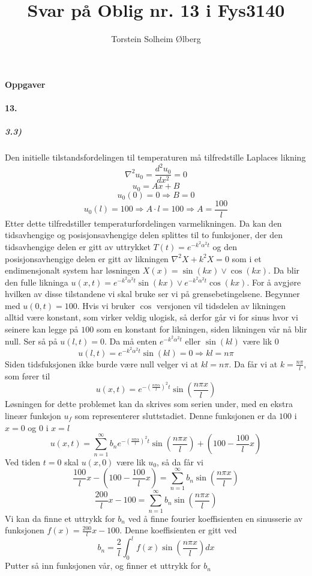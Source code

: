 \documentclass[11pt, A4paper,norsk]{article}
\author{Torstein Solheim Ølberg}
\title{Svar på Oblig nr. 13 i Fys3140}
\begin{document}
\maketitle
	\begin{center}
\Large \textbf{Oppgaver}
	\end{center}









		\paragraph{13.}
			\subparagraph{3.3)}
				\begin{flushleft}
Den initielle tilstandsfordelingen til temperaturen må tilfredstille Laplaces likning
$$\nabla^2 u_0 = \frac{d^2 u_0}{dx^2} = 0$$
$$u_0 = Ax + B$$
$$u_0(0) = 0 \Rightarrow B = 0$$
$$u_0(l) = 100 \Rightarrow A \cdot l = 100 \Rightarrow A = \frac{100}{l}$$
Etter dette tilfredstiller temperaturfordelingen varmelikningen. Da kan den tidsavhengige og posisjonsavhengige delen splittes til to funksjoner, der den tidsavhengige delen er gitt av uttrykket $T(t) = e^{- k^2 \alpha^2 t}$ og den posisjonsavhengige delen er gitt av likningen $\nabla^2 X + k^2 X = 0$ som i et endimensjonalt system har løsningen $X(x) = \sin(kx) \vee \cos(kx)$. Da blir den fulle likninga $u(x, t) = e^{- k^2 \alpha^2 t} \sin(kx) \vee  e^{- k^2 \alpha^2 t} \cos(k x)$. For å avgjøre hvilken av disse tilstandene vi skal bruke ser vi på grensebetingelsene. Begynner med $u(0, t) = 100$. Hvis vi bruker $\cos$ versjonen vil tidsdelen av likningen alltid være konstant, som virker veldig ulogisk, så derfor går vi for sinus hvor vi seinere kan legge på $100$ som en konstant for likningen, siden likningen vår nå blir null. Ser så på $u(l, t) = 0$. Da må enten $e^{- k^2 \alpha^2 t}$ eller $\sin(kl)$ være lik $0$
$$u(l, t) = e^{- k^2 \alpha^2 t} \sin(kl) = 0 \Rightarrow kl = n \pi$$
Siden tidsfuksjonen ikke burde være null velger vi at $kl = n \pi$. Da får vi at $k = \frac{n \pi}{l}$, som fører til
$$u(x, t) = e^{- \left( \frac{n \pi \alpha}{l} \right)^2 t} \sin\left( \frac{n \pi x}{l} \right)$$
Løsningen for dette problemet kan da skrives som serien under, med en ekstra lineær funksjon $u_f$ som representerer sluttstadiet. Denne funksjonen er da $100$ i $x = 0$ og $0$ i $x = l$
$$u(x, t) = \sum_{n = 1}^{\infty} b_n e^{- \left( \frac{n \pi \alpha}{l} \right)^2 t} \sin\left( \frac{n \pi x}{l} \right) + \left( 100 - \frac{100}{l}x \right)$$
Ved tiden $t = 0$ skal $u(x, 0)$ være lik $u_0$, så da får vi
$$\frac{100}{l}x - \left( 100 - \frac{100}{l}x \right) = \sum_{n = 1}^{\infty} b_n \sin\left( \frac{n \pi x}{l} \right)$$
$$\frac{200}{l}x - 100 = \sum_{n = 1}^{\infty} b_n \sin\left( \frac{n \pi x}{l} \right)$$
Vi kan da finne et uttrykk for $b_n$ ved å finne fourier koeffisienten en sinusserie av funksjonen $f(x) = \frac{200}{l}x - 100$. Denne koeffisienten er gitt ved
$$b_n = \frac{2}{l} \int_{0}^{l} f(x) \sin\left( \frac{n \pi x}{l} \right) dx$$
Putter så inn funksjonen vår, og finner et uttrykk for $b_n$
				\end{flushleft}
\end{document}
